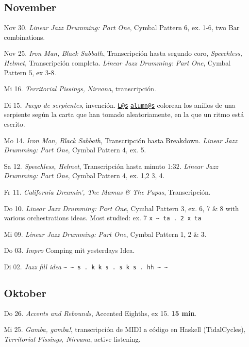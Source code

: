 \documentclass[
]{book}
\begin{document}
\subsection*{November}\label{november-2022}

Nov 30. \emph{Linear Jazz Drumming: Part One}, Cymbal Pattern 6, ex. 1-6, two Bar combinations.

Nov 25. \emph{Iron Man, Black Sabbath}, Transcripción hasta segundo coro, \emph{Speechless, Helmet}, Transcripción completa. \emph{Linear Jazz Drumming: Part One}, Cymbal Pattern 5, ex 3-8.

Mi 16. \emph{Territorial Pissings, Nirvana}, transcripción.

Di 15. \emph{Juego de serpientes}, invención. \href{mailto:L@s}{\nolinkurl{L@s}} \href{mailto:alumn@s}{\nolinkurl{alumn@s}} colorean los anillos de una serpiente según la carta que han tomado aleatoriamente, en la que un ritmo está escrito.

Mo 14. \emph{Iron Man, Black Sabbath}, Transcripción hasta Breakdown. \emph{Linear Jazz Drumming: Part One}, Cymbal Pattern 4, ex. 5.

Sa 12. \emph{Speechless, Helmet}, Transcripción hasta minuto 1:32. \emph{Linear Jazz Drumming: Part One}, Cymbal Pattern 4, ex. 1,2 3, 4.

Fr 11. \emph{California Dreamin', The Mamas \& The Papas}, Transcripción.

Do 10. \emph{Linear Jazz Drumming: Part One}, Cymbal Pattern 3, ex. 6, 7 \& 8 with various orchestrations ideas. Most studied: ex. 7 \texttt{x\ \textasciitilde{}\ ta\ .\ 2\ x\ ta}

Mi 09. \emph{Linear Jazz Drumming: Part One}, Cymbal Pattern 1, 2 \& 3.

Do 03. \emph{Impro} Comping mit yesterdays Idea.

Di 02. \emph{Jazz fill idea} \texttt{\textasciitilde{}\ \textasciitilde{}\ s\ .\ k\ k\ s\ .\ s\ k\ s\ .\ hh\ \textasciitilde{}\ \textasciitilde{}}

\subsection*{Oktober}\label{oktober-2022}

Do 26. \emph{Accents and Rebounds}, Accented Eighths, ex 15. \textbf{15 min}.

Mi 25. \emph{Gamba, gamba!}, transcripción de MIDI a código en Haskell (TidalCycles), \emph{Territorial Pissings, Nirvana}, active listening.
\end{document}
